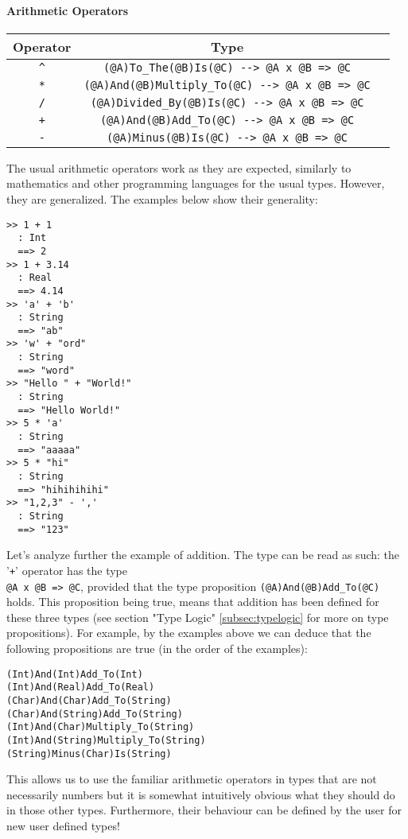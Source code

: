 \documentclass{article}
\begin{document}
\paragraph{Arithmetic Operators}
\begin{center}
\begin{tabular}{ |c|c|c| }
\hline
Operator & Type
\\
\hline
\hline
\verb|^| & \verb|(@A)To_The(@B)Is(@C) --> @A x @B => @C|
\\
\hline
\verb|*| & \verb|(@A)And(@B)Multiply_To(@C) --> @A x @B => @C|
\\
\hline
\verb|/| & \verb|(@A)Divided_By(@B)Is(@C) --> @A x @B => @C|
\\
\hline
\verb|+| & \verb|(@A)And(@B)Add_To(@C) --> @A x @B => @C|
\\
\hline
\verb|-| & \verb|(@A)Minus(@B)Is(@C) --> @A x @B => @C|
\\
\hline
\end{tabular}
\end{center}
The usual arithmetic operators work as they are expected, similarly to
mathematics and other programming languages for the usual types. However, they
are generalized. The examples below show their generality:
\begin{verbatim}
>> 1 + 1
  : Int
  ==> 2
>> 1 + 3.14
  : Real
  ==> 4.14
>> 'a' + 'b'
  : String
  ==> "ab"
>> 'w' + "ord"
  : String
  ==> "word"
>> "Hello " + "World!"
  : String
  ==> "Hello World!"
>> 5 * 'a'
  : String
  ==> "aaaaa"
>> 5 * "hi"
  : String
  ==> "hihihihihi"
>> "1,2,3" - ','
  : String
  ==> "123"
\end{verbatim}
Let's analyze further the example of addition. The type can be read as such:
the '\verb|+|' operator has the type \\ \verb|@A x @B => @C|, provided that the
type proposition \verb|(@A)And(@B)Add_To(@C)| holds. This proposition being
true, means that addition has been defined for these three types (see section
"Type Logic" \ref{subsec:typelogic} for more on type propositions). For
example, by the examples above we can deduce that the following propositions
are true (in the order of the examples):
\begin{verbatim}
(Int)And(Int)Add_To(Int)
(Int)And(Real)Add_To(Real)
(Char)And(Char)Add_To(String)
(Char)And(String)Add_To(String)
(Int)And(Char)Multiply_To(String)
(Int)And(String)Multiply_To(String)
(String)Minus(Char)Is(String)
\end{verbatim}
This allows us to use the familiar arithmetic operators in types that are not
necessarily numbers but it is somewhat intuitively obvious what they should do
in those other types. Furthermore, their behaviour can be defined by the user
for new user defined types!
\end{document}
